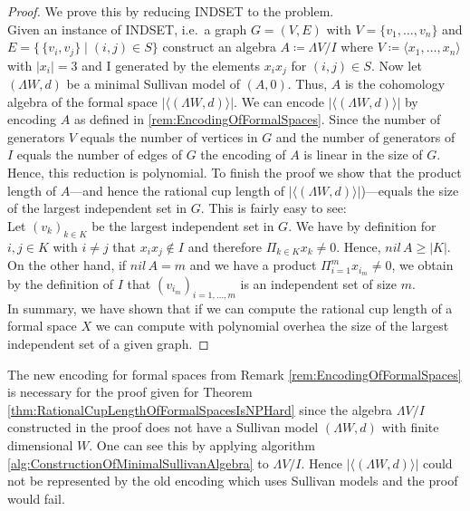 \begin{proof}
 We  prove this by reducing  INDSET to the problem. \\
 Given an instance of INDSET, i.e.\ a graph $G = (V,E)$ with $V = \lbrace v_1 , \ldots , v_n \rbrace$ and 
 $E = \lbrace \, \lbrace v_i, v_j \rbrace \; | \; (i,j) \in S \rbrace$ construct an algebra 
 $A \coloneqq \Lambda V /I$ where $V \coloneqq \langle x_1, \ldots , x_n \rangle$ with $|x_i| = 3$ and I generated by
 the elements $x_i x_j$ for $(i,j) \in S$. Now let $(\Lambda W,d)$ be a minimal Sullivan model of $(A,0)$. Thus,
 $A$ is  the cohomology algebra of the formal space $ | \langle (\Lambda W,d) \rangle | $. 
 We can encode $| \langle (\Lambda W,d) \rangle |$ by encoding $A$ as defined in \ref{rem:EncodingOfFormalSpaces}.
 Since the number of generators $V$ equals the number of vertices in $G$ and the number of generators of $I$ equals
 the number of edges of $G$ the encoding of $A$ is linear in the size of $G$. Hence, this reduction
 is polynomial. To finish the proof we show that the product length of $A$---and hence the rational cup length of 
 $| \langle (\Lambda W,d) \rangle | $)---equals the size of the largest
 independent set in $G$. This is fairly easy to see: \\
 Let $(v_k)_{k \in K}$ be the largest independent set in $G$. We have by definition for $i,j \in K$ with  $i\neq j$
 that $x_i x_j \notin I$ and therefore $\Pi_{k \in K} x_k \neq 0$. Hence, $nil \, A \geq |K|$. On the other hand,
 if $nil \, A = m$ and we have a product  $\Pi_{i = 1}^m x_{i_m} \neq 0$, we obtain by the definition of $I$ that 
 $(v_{i_m})_{i = 1, \ldots, m}$ is an independent set of size $m$. \\In summary, we have shown that if we can compute
 the rational cup length of a formal space $X$ we can compute with polynomial overhea the size of the largest
 independent set of a given graph.
 
\end{proof}

\begin{Remark}
 The new encoding for formal spaces from Remark \ref{rem:EncodingOfFormalSpaces} is necessary for the proof given 
 for Theorem \ref{thm:RationalCupLengthOfFormalSpacesIsNPHard} since the algebra $\Lambda V /I$ constructed
 in the proof does not have a Sullivan model $(\Lambda W, d)$ with finite dimensional $W$. One can see
 this by applying algorithm \ref{alg:ConstructionOfMinimalSullivanAlgebra} to $\Lambda V /I$.
 Hence $ | \langle (\Lambda W,d) \rangle | $ could not be represented by the old encoding which uses Sullivan models
 and the proof would fail.
\end{Remark}
